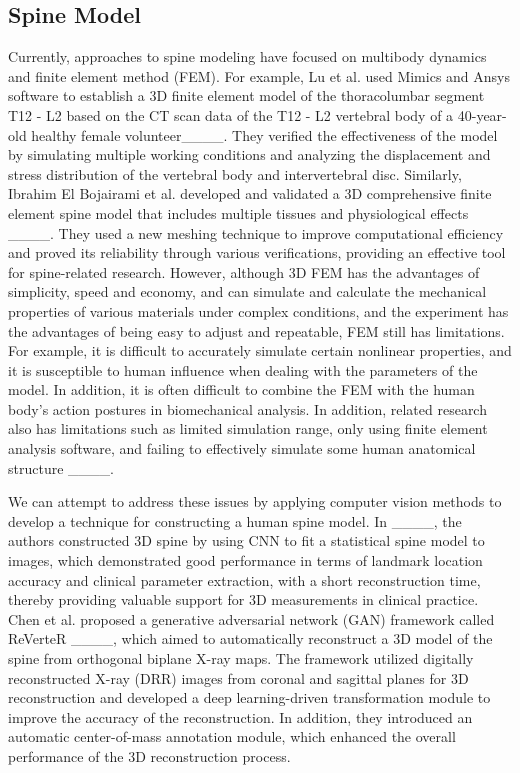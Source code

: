 \subsection{Spine Model}
Currently, approaches to spine modeling have focused on multibody dynamics and finite element method (FEM). For example, Lu et al. used Mimics and Ansys software to establish a 3D finite element model of the thoracolumbar segment T12 - L2 based on the CT scan data of the T12 - L2 vertebral body of a 40-year-old healthy female volunteer____. They verified the effectiveness of the model by simulating multiple working conditions and analyzing the displacement and stress distribution of the vertebral body and intervertebral disc. Similarly, Ibrahim El Bojairami et al. developed and validated a 3D comprehensive finite element spine model that includes multiple tissues and physiological effects ____. They used a new meshing technique to improve computational efficiency and proved its reliability through various verifications, providing an effective tool for spine-related research. However, although 3D FEM has the advantages of simplicity, speed and economy, and can simulate and calculate the mechanical properties of various materials under complex conditions, and the experiment has the advantages of being easy to adjust and repeatable, FEM still has limitations. For example, it is difficult to accurately simulate certain nonlinear properties, and it is susceptible to human influence when dealing with the parameters of the model. In addition, it is often difficult to combine the FEM with the human body's action postures in biomechanical analysis. In addition, related research also has limitations such as limited simulation range, only using finite element analysis software, and failing to effectively simulate some human anatomical structure ____.
\par We can attempt to address these issues by applying computer vision methods to develop a technique for constructing a human spine model. In ____, the authors constructed 3D spine by using CNN to fit a statistical spine model to images, which demonstrated good performance in terms of landmark location accuracy and clinical parameter extraction, with a short reconstruction time, thereby providing valuable support for 3D measurements in clinical practice. Chen et al. proposed a generative adversarial network (GAN) framework called ReVerteR ____, which aimed to automatically reconstruct a 3D model of the spine from orthogonal biplane X-ray maps. The framework utilized digitally reconstructed X-ray (DRR) images from coronal and sagittal planes for 3D reconstruction and developed a deep learning-driven transformation module to improve the accuracy of the reconstruction. In addition, they introduced an automatic center-of-mass annotation module, which enhanced the overall performance of the 3D reconstruction process.
